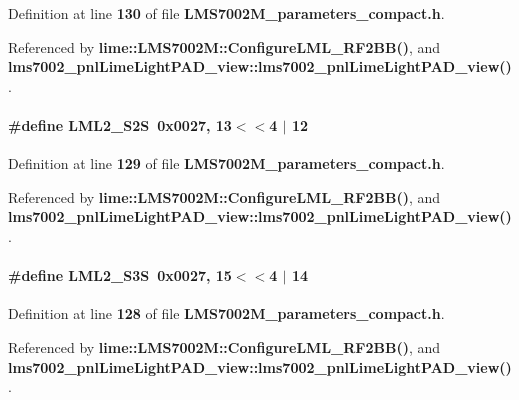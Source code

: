 Definition at line {\bf 130} of file {\bf L\+M\+S7002\+M\+\_\+parameters\+\_\+compact.\+h}.



Referenced by {\bf lime\+::\+L\+M\+S7002\+M\+::\+Configure\+L\+M\+L\+\_\+\+R\+F2\+B\+B()}, and {\bf lms7002\+\_\+pnl\+Lime\+Light\+P\+A\+D\+\_\+view\+::lms7002\+\_\+pnl\+Lime\+Light\+P\+A\+D\+\_\+view()}.

\paragraph[{L\+M\+L2\+\_\+\+S2S}]{\setlength{\rightskip}{0pt plus 5cm}\#define L\+M\+L2\+\_\+\+S2S~0x0027, 13$<$$<$4 $\vert$  12}\label{LMS7002M__parameters__compact_8h_aab2c7f12beefd0a8ca53a13e21149b50}


Definition at line {\bf 129} of file {\bf L\+M\+S7002\+M\+\_\+parameters\+\_\+compact.\+h}.



Referenced by {\bf lime\+::\+L\+M\+S7002\+M\+::\+Configure\+L\+M\+L\+\_\+\+R\+F2\+B\+B()}, and {\bf lms7002\+\_\+pnl\+Lime\+Light\+P\+A\+D\+\_\+view\+::lms7002\+\_\+pnl\+Lime\+Light\+P\+A\+D\+\_\+view()}.

\paragraph[{L\+M\+L2\+\_\+\+S3S}]{\setlength{\rightskip}{0pt plus 5cm}\#define L\+M\+L2\+\_\+\+S3S~0x0027, 15$<$$<$4 $\vert$  14}\label{LMS7002M__parameters__compact_8h_acc03f61f27a0319da90f997b7a7c9060}


Definition at line {\bf 128} of file {\bf L\+M\+S7002\+M\+\_\+parameters\+\_\+compact.\+h}.



Referenced by {\bf lime\+::\+L\+M\+S7002\+M\+::\+Configure\+L\+M\+L\+\_\+\+R\+F2\+B\+B()}, and {\bf lms7002\+\_\+pnl\+Lime\+Light\+P\+A\+D\+\_\+view\+::lms7002\+\_\+pnl\+Lime\+Light\+P\+A\+D\+\_\+view()}.

